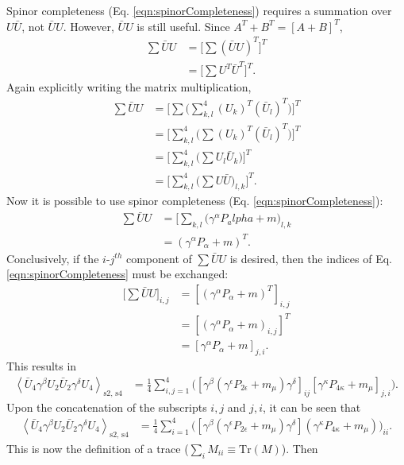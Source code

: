 Spinor completeness (Eq. \eqref{eqn:spinorCompleteness}) requires a summation over $U\bar{U}$, not $\bar{U}U$. However, $\bar{U}U$ is still useful. Since $A^T+B^T=[A+B]^T$,
\begin{align*}
\sum \bar{U}U 
&= \Big[\sum (\bar{U}U)^T\Big]^T\\
&=\Big[\sum U^T \bar{U}^T\Big]^T.
\end{align*}
Again explicitly writing the matrix multiplication,
\begin{align*}
\sum \bar{U}U 
&=\Big[\sum\Big(\sum_{k,l} ^4 (U_k)^T(\bar{U}_l)^T\Big)\Big]^T\\
&=\Big[\sum_{k,l} ^4 \Big(\sum (U_k)^T (\bar{U}_l)^T \Big)\Big]^T\\
&=\Big[\sum_{k,l}^4\Big(\sum U_l \bar{U}_k\Big)\Big]^T\\
&=\Big[\sum_{k,l}^4\Big(\sum U\bar{U})_{l,k}\Big]^T.
\end{align*}
Now it is possible to use spinor completeness (Eq. \eqref{eqn:spinorCompleteness}):
\begin{align*}
\sum \bar{U}U 
&=\Big[\sum_{k,l}\big(\gamma^\alpha P_alpha + m\big) _{l,k}\\
&=(\gamma^\alpha P_\alpha + m)^T.
\end{align*}
Conclusively, if the $i$-$j^{th}$ component of $\sum \bar{U}U$ is desired, then the indices of Eq. \eqref{eqn:spinorCompleteness} must be exchanged:
\begin{align*}
\Big[\sum\bar{U} U\Big]_{i,j}
&=[(\gamma^\alpha P_\alpha + m)^T]_{i,j}\\
&=[(\gamma^\alpha P_\alpha + m)_{i,j}]^T\\
&=[\gamma^\alpha P_\alpha + m]_{j,i}.
\end{align*}
This results in
\begin{align*}
\left< \bar{U}_4 \gamma^\beta U_2 \bar{U}_2 \gamma^\delta U_4 \right> _\text{s2, s4}
&=\frac{1}{4}\sum_{i,j=1} ^4 \Big([\gamma^\beta(\gamma^\epsilon P_{2\epsilon}+m_\mu)\gamma^\delta]_{ij} [\gamma^\kappa P_{4\kappa}+m_\mu]_{j,i} \Big).
\end{align*}
Upon the concatenation of the subscripts $i,j$ and $j,i$, it can be seen that
\begin{align*}
\left< \bar{U}_4 \gamma^\beta U_2 \bar{U}_2 \gamma^\delta U_4 \right> _\text{s2, s4}
&=\frac{1}{4}\sum_{i=1} ^4 \Big([\gamma^\beta(\gamma^\epsilon P_{2\epsilon}+m_\mu)\gamma^\delta] (\gamma^\kappa P_{4\kappa}+m_\mu) \Big)_{ii}.
\end{align*}
This is now the definition of a trace ($\sum_i M_{ii} \equiv \text{Tr} (M)$). Then
